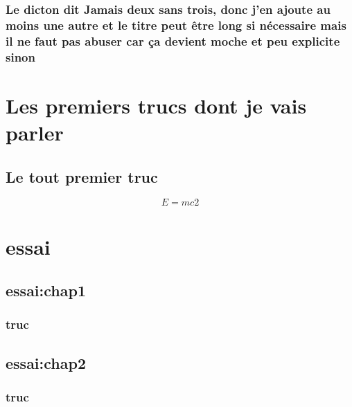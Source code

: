 \documentclass[bare]{polytech/polytech}
\begin{document}
                       
           
     
\section{Le dicton dit \og{}Jamais deux sans trois\fg{}, donc j'en ajoute au moins une autre et le titre peut être long si nécessaire mais il ne faut pas abuser car ça devient moche et peu explicite sinon}

\lipsum[1-3] 

\part{Les premiers trucs dont je vais parler}                
\label{part:premierstrucs}

\chapter{Le tout premier truc}   
\label{chap:toutpremier}

\begin{equation}
\label{eq:2} 
E=mc2
\end{equation}       
  
  

\lipsum[1]
           

\part{essai}
\label{part:essai}
 
\chapter{essai:chap1}
\label{essai:chap1}
      
\lipsum[1-4]
     
\section{truc}

\label{essai:chap1:sec}

\chapter*{essai:chap2}
\label{essai:chap2}
     
\lipsum[1-4]

\section{truc}
\end{document}
